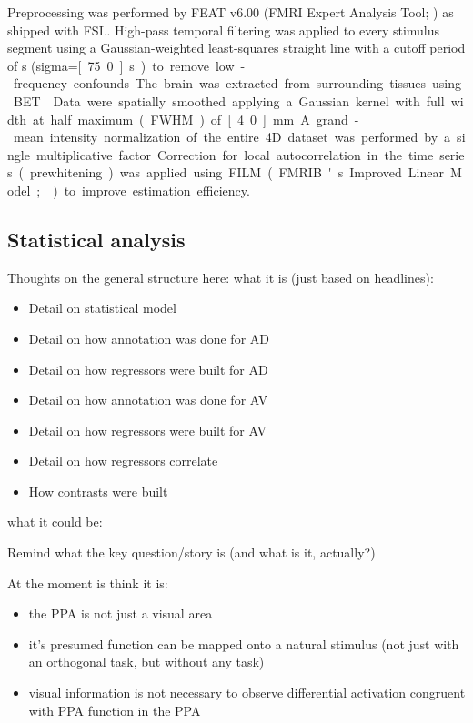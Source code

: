 \documentclass[english]{article}
\begin{document}
Preprocessing was performed by FEAT v6.00 (FMRI Expert Analysis Tool;
\citep{woolrich2001autocorr}) as shipped with FSL.
High-pass temporal filtering was applied to every stimulus segment using a
Gaussian-weighted least-squares straight line with a cutoff period of
\unit[150]{s} (sigma=\unit[75.0]{s}) to remove low-frequency confounds.
The brain was extracted from surrounding tissues using BET \citep{smith2002bet}.
Data were spatially smoothed applying a Gaussian kernel with full width at half
maximum (FWHM) of \unit[4.0]{mm}.
A grand-mean intensity normalization of the entire 4D dataset was performed by a
single multiplicative factor.
Correction for local autocorrelation in the time series (prewhitening) was
applied using FILM (FMRIB's Improved Linear Model; \citep{woolrich2001autocorr})
to improve estimation efficiency.


\subsection{Statistical analysis}

Thoughts on the general structure here: what it is (just based on headlines):

\begin{itemize}
  \item Detail on statistical model
  \item Detail on how annotation was done for AD
  \item Detail on how regressors were built for AD
  \item Detail on how annotation was done for AV
  \item Detail on how regressors were built for AV
  \item Detail on how regressors correlate
  \item How contrasts were built
\end{itemize}

\noindent what it could be:
  
Remind what the key question/story is (and what is it, actually?)

At the moment is think it is:

\begin{itemize}
  \item the PPA is not just a visual area
  \item it's presumed function can be mapped onto a natural stimulus (not just with an orthogonal task, but without any task)
  \item visual information is not necessary to observe differential activation congruent with PPA function in the PPA
\end{itemize}
\end{document}
